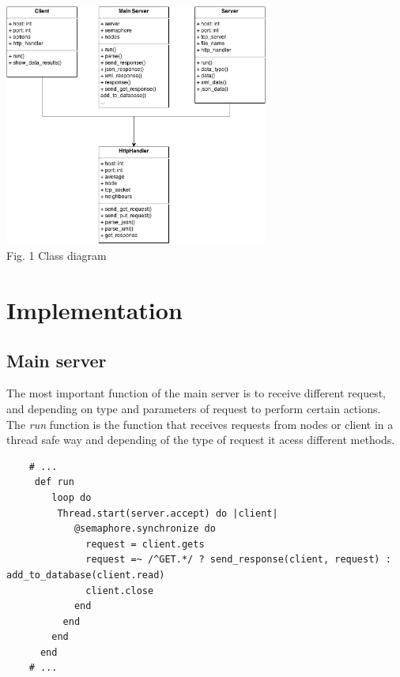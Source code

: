 \documentclass[12pt]{article}
\begin{document}
    \begin{minipage}[b]{1.0\linewidth}
      \begin{center}
        \includegraphics[width=0.65\textwidth]{diagram}
         \\ Fig. 1 Class diagram
      \end{center}
    \end{minipage}
    
  \section{Implementation}

    \subsection{Main server}

    The most important function of the main server is to receive different request, and 
    depending on type and parameters of request to perform certain actions.  \\

    The \textit{run} function is the function that receives requests from nodes or
    client in a thread safe way and depending of the type of request it acess different 
    methods. 

    \begin{lstlisting}
    # ...
     def run
        loop do
         Thread.start(server.accept) do |client|
            @semaphore.synchronize do
              request = client.gets
              request =~ /^GET.*/ ? send_response(client, request) : add_to_database(client.read)
              client.close
            end
          end
        end
      end
    # ... 
    \end{lstlisting}
\end{document}
